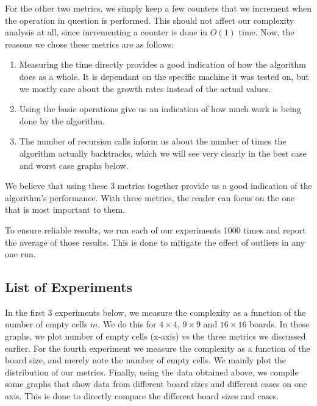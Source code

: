\documentclass[16pt]{article}
\begin{document}
For the other two metrics, we simply keep a few counters that we increment when the operation in question is performed. This should not affect our complexity analysis at all, since incrementing a counter is done in $O(1)$ time.
\newline
\newline
Now, the reasons we chose these metrics are as follows: 
\begin{enumerate}
    \item Measuring the time directly provides a good indication of how the algorithm does as a whole. 
    It is dependant on the specific machine it was tested on, but we mostly care about the growth rates instead of the actual values.
    \item Using the basic operations give us an indication of how much work is being done by the algorithm.
    \item The number of recursion calls inform us about the number of times the algorithm actually backtracks, which we will see very clearly in the best case and worst case graphs below.
\end{enumerate}
We believe that using these 3 metrics together provide us a good indication of the algorithm's performance.
\newline
With three metrics, the reader can focus on the one that is most important to them.
\newline
\newline

To ensure reliable results, we run each of our experiments 1000 times and report the average of those results.
This is done to mitigate the effect of outliers in any one run.
\subsection{List of Experiments}
In the first 3 experiments below, we measure the complexity as a function of the number of empty cells $m$.
We do this for $4 \times 4$, $9 \times 9$ and $16 \times 16$ boards.
In these graphs, we plot number of empty cells (x-axis) vs the three metrics we discussed earlier.
\newline
For the fourth experiment we measure the complexity as a function of the board size, and merely note the number of empty cells.
We mainly plot the distribution of our metrics.
\newline
Finally, using the data obtained above, we compile some graphs that show data from different board sizes and different cases on one axis.
This is done to directly compare the different board sizes and cases.
\end{document}
